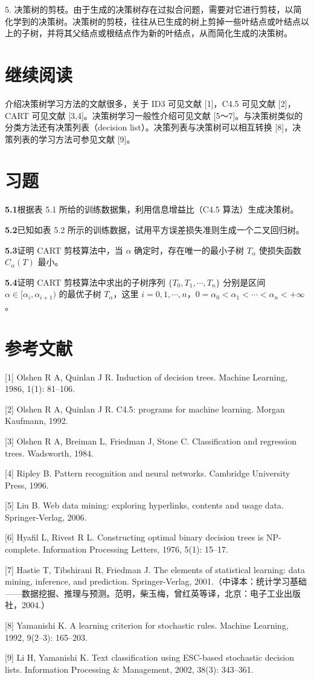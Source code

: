 \documentclass[UTF8, 12pt, fontset=fandol, oneside]{ctexart}
\begin{document}
5. 决策树的剪枝。由于生成的决策树存在过拟合问题，需要对它进行剪枝，以简化学到的决策树。决策树的剪枝，往往从已生成的树上剪掉一些叶结点或叶结点以上的子树，并将其父结点或根结点作为新的叶结点，从而简化生成的决策树。

\section*{继续阅读}

介绍决策树学习方法的文献很多，关于 ID3 可见文献 [1]，C4.5 可见文献 [2]，CART 可见文献 [3,4]。决策树学习一般性介绍可见文献 [5～7]。与决策树类似的分类方法还有决策列表（decision list）。决策列表与决策树可以相互转换 [8]，决策列表的学习方法可参见文献 [9]。

\section*{习题}

\noindent\textbf{5.1}\quad 根据表 5.1 所给的训练数据集，利用信息增益比（C4.5 算法）生成决策树。

\noindent\textbf{5.2}\quad 已知如表 5.2 所示的训练数据，试用平方误差损失准则生成一个二叉回归树。

\noindent\textbf{5.3}\quad 证明 CART 剪枝算法中，当 $\alpha$ 确定时，存在唯一的最小子树 $T_\alpha$ 使损失函数 $C_\alpha(T)$ 最小。

\noindent\textbf{5.4}\quad 证明 CART 剪枝算法中求出的子树序列 $\{T_0,T_1,\cdots,T_n\}$ 分别是区间 $\alpha\in[\alpha_i,\alpha_{i+1})$ 的最优子树 $T_\alpha$，这里 $i=0,1,\cdots,n$，$0=\alpha_0<\alpha_1<\cdots<\alpha_n<+\infty$。

\section*{参考文献}

[1] Olshen R A, Quinlan J R. Induction of decision trees. Machine Learning, 1986, 1(1): 81--106.

[2] Olshen R A, Quinlan J R. C4.5: programs for machine learning. Morgan Kaufmann, 1992.

[3] Olshen R A, Breiman L, Friedman J, Stone C. Classification and regression trees. Wadsworth, 1984.

[4] Ripley B. Pattern recognition and neural networks. Cambridge University Press, 1996.

[5] Liu B. Web data mining: exploring hyperlinks, contents and usage data. Springer-Verlag, 2006.

[6] Hyafil L, Rivest R L. Constructing optimal binary decision trees is NP-complete. Information Processing Letters, 1976, 5(1): 15--17.

[7] Hastie T, Tibshirani R, Friedman J. The elements of statistical learning: data mining, inference, and prediction. Springer-Verlag, 2001.（中译本：统计学习基础——数据挖掘、推理与预测。范明，柴玉梅，曾红英等译，北京：电子工业出版社，2004.）

[8] Yamanishi K. A learning criterion for stochastic rules. Machine Learning, 1992, 9(2--3): 165--203.

[9] Li H, Yamanishi K. Text classification using ESC-based stochastic decision lists. Information Processing \& Management, 2002, 38(3): 343--361.
\end{document}
